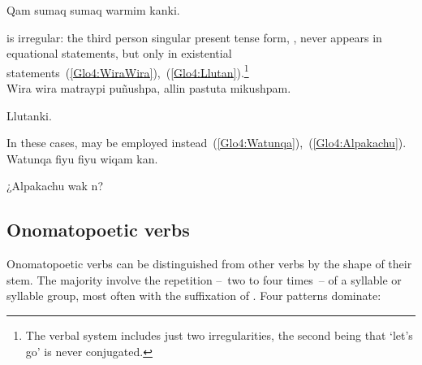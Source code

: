 %
{Qam sumaq sumaq warmim kanki.}%
{}%
{}{}%

\noindent
{} is irregular: the third person singular present tense form, , never appears in equational statements, but only in existential statements~(\ref{Glo4:WiraWira}),~(\ref{Glo4:Llutan}).\footnote{The verbal system includes just two irregularities, the second being that  ‘let’s go’ is never conjugated.}\\

%
{Wira wira matraypi puñushpa, allin pastuta mikushpam.}%
{}%
{}{}%

%
{Llutanki.}%
{}%
{}{}%

\noindent
In these cases,  may be employed instead~(\ref{Glo4:Watunqa}),~(\ref{Glo4:Alpakachu}).\\

%
{Watunqa fiyu fiyu wiqam kan.}%
{}%
{}{}%

%
{¿Alpakachu wak n?}%
{}%
{}{}%

\subsection{Onomatopoetic verbs}\label{sec:onomatopoeicverbs}
Onomatopoetic verbs can be distinguished from other verbs by the shape of their stem. The majority involve the repetition --~two to four times~-- of a syllable or syllable group, most often with the suffixation of . Four patterns dominate:\\[1em]

